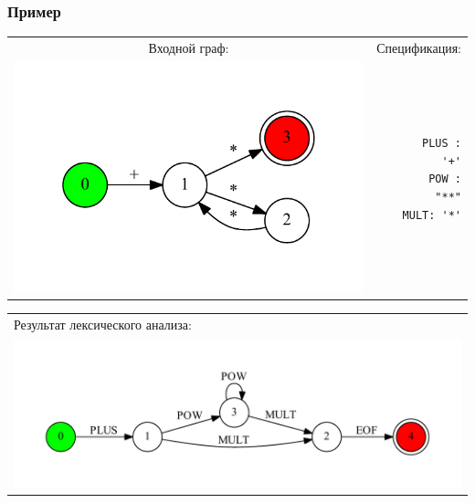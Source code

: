 \documentclass{beamer}
\begin{document}
\begin{frame}[fragile]
\transwipe[direction=90]
\frametitle{Пример}

\begin{tabular}{c r}
     Входной граф: & Спецификация: \\
     \begin{minipage}{.4\textwidth} 
     \includegraphics[width=\linewidth]{calc_ex}
     \end{minipage}  
     & 
	\begin{minipage}{.3\textwidth}    
	\begin{verbatim}
   PLUS : '+'
   POW : "**"
   MULT: '*'
	\end{verbatim}
	\end{minipage}
\end{tabular} 
 	
\begin{tabular}{l}		 	
	Результат лексического анализа: \\
    \includegraphics[width=0.8\linewidth]{calc_ex_res}    
\end{tabular}

\end{frame}
\end{document}
